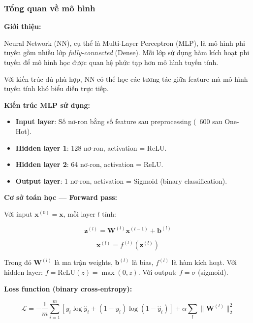 \documentclass[12pt, a4paper]{article}
\begin{document}
\subsubsection{Tổng quan về mô hình}

\textbf{Giới thiệu:}

Neural Network (NN), cụ thể là Multi-Layer Perceptron (MLP), là mô hình phi tuyến gồm nhiều lớp \emph{fully-connected} (Dense). Mỗi lớp sử dụng hàm kích hoạt phi tuyến để mô hình học được quan hệ phức tạp hơn mô hình tuyến tính.

Với kiến trúc đủ phù hợp, NN có thể học các tương tác giữa feature mà mô hình tuyến tính khó biểu diễn trực tiếp.

\textbf{Kiến trúc MLP sử dụng:}

\begin{itemize}
    \item \textbf{Input layer}: Số nơ-ron bằng số feature sau preprocessing (~600 sau One-Hot).
    \item \textbf{Hidden layer 1}: 128 nơ-ron, activation = ReLU.
    \item \textbf{Hidden layer 2}: 64 nơ-ron, activation = ReLU.
    \item \textbf{Output layer}: 1 nơ-ron, activation = Sigmoid (binary classification).
\end{itemize}

\textbf{Cơ sở toán học --- Forward pass:}

Với input $\mathbf{x}^{(0)} = \mathbf{x}$, mỗi layer $l$ tính:

\begin{equation}
\mathbf{z}^{(l)} = \mathbf{W}^{(l)} \mathbf{x}^{(l-1)} + \mathbf{b}^{(l)}
\end{equation}

\begin{equation}
\mathbf{x}^{(l)} = f^{(l)}(\mathbf{z}^{(l)})
\end{equation}

Trong đó $\mathbf{W}^{(l)}$ là ma trận weights, $\mathbf{b}^{(l)}$ là bias, $f^{(l)}$ là hàm kích hoạt. Với hidden layer: $f = \text{ReLU}(z) = \max(0, z)$. Với output: $f = \sigma$ (sigmoid).

\textbf{Loss function (binary cross-entropy):}

\begin{equation}
\mathcal{L} = -\frac{1}{m} \sum_{i=1}^{m} \left[ y_i \log \hat{y}_i + (1-y_i) \log(1-\hat{y}_i) \right] + \alpha \sum_{l} \|\mathbf{W}^{(l)}\|_2^2
\end{equation}
\end{document}
